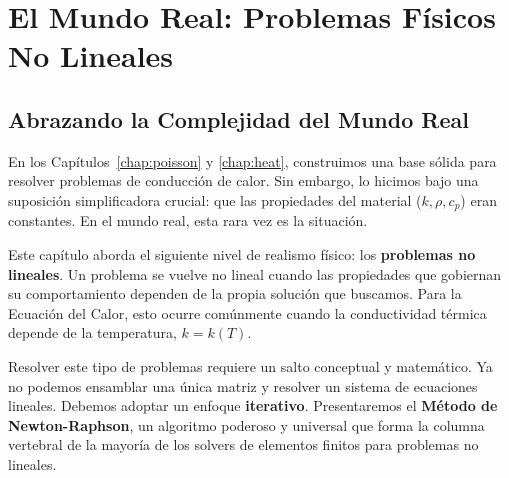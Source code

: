 \chapter{El Mundo Real: Problemas Físicos No Lineales}
\label{chap:nonlinear}

\section{Abrazando la Complejidad del Mundo Real}

En los Capítulos~\ref{chap:poisson} y \ref{chap:heat}, construimos una base sólida para resolver problemas de conducción de calor. Sin embargo, lo hicimos bajo una suposición simplificadora crucial: que las propiedades del material (\(k, \rho, c_p\)) eran constantes. En el mundo real, esta rara vez es la situación.

Este capítulo aborda el siguiente nivel de realismo físico: los \textbf{problemas no lineales}. Un problema se vuelve no lineal cuando las propiedades que gobiernan su comportamiento dependen de la propia solución que buscamos. Para la Ecuación del Calor, esto ocurre comúnmente cuando la conductividad térmica depende de la temperatura, \(k = k(T)\).

Resolver este tipo de problemas requiere un salto conceptual y matemático. Ya no podemos ensamblar una única matriz y resolver un sistema de ecuaciones lineales. Debemos adoptar un enfoque \textbf{iterativo}. Presentaremos el \textbf{Método de Newton-Raphson}, un algoritmo poderoso y universal que forma la columna vertebral de la mayoría de los solvers de elementos finitos para problemas no lineales.

